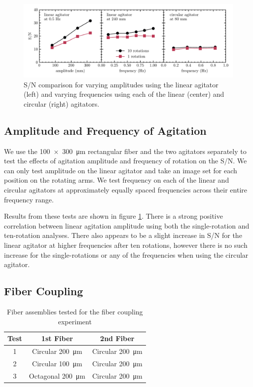 \documentclass[twocolumn]{emulateapj}
\begin{document}
\begin{figure}[t]
\centering
	\includegraphics[width=\textwidth]{images/amp_freq_snr.pdf}
	\caption{S/N comparison for varying amplitudes using the linear agitator (left) and varying frequencies using each of the linear (center) and circular (right) agitators.}
\label{fig:amp_freq_snr}
\end{figure}

\subsection{Amplitude and Frequency of Agitation}
\label{subsec:amp_freq}

We use the \SI{100x300}{\micro\meter} rectangular fiber and the two agitators separately to test the effects of agitation amplitude and frequency of rotation on the S/N. We can only test amplitude on the linear agitator and take an image set for each position on the rotating arms. We test frequency on each of the linear and circular agitators at approximately equally spaced frequencies across their entire frequency range.

Results from these tests are shown in figure \ref{fig:amp_freq_snr}. There is a strong positive correlation between linear agitation amplitude using both the single-rotation and ten-rotation analyses. There also appears to be a slight increase in S/N for the linear agitator at higher frequencies after ten rotations, however there is no such increase for the single-rotations or any of the frequencies when using the circular agitator.

\subsection{Fiber Coupling}

\begin{table}
\centering
\caption{Fiber assemblies tested for the fiber coupling experiment}
	\begin{tabular}{ccc}
	\hline
	Test & 1st Fiber & 2nd Fiber \\
	\hline \hline
	1 & Circular \SI{200}{\micro\meter} & Circular \SI{200}{\micro\meter} \\
	\hline
	2 & Circular \SI{100}{\micro\meter} & Circular \SI{200}{\micro\meter} \\
	\hline
	3 & Octagonal \SI{200}{\micro\meter} & Circular \SI{200}{\micro\meter} \\
	\hline
	\end{tabular}
\label{table:fiber_coupling}
\end{table}
\end{document}
